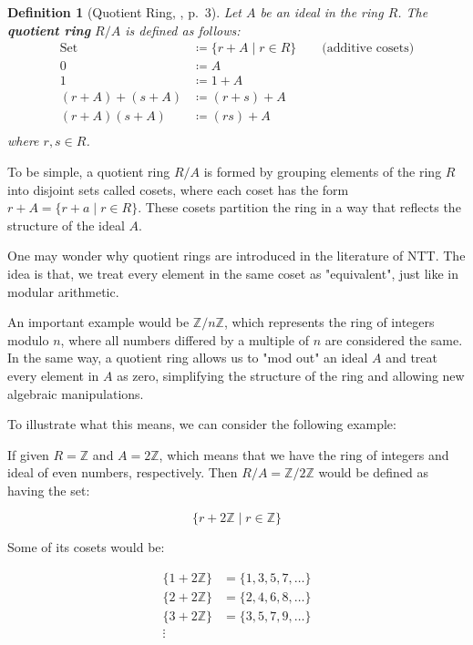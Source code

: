\documentclass[12pt]{article}
\newtheorem{definition}{Definition}[section]
\begin{document}
\begin{definition}[Quotient Ring, \cite{ideal_quotientring}, p.~3]
    Let $A$ be an ideal in the ring $R$.
    The \textbf{quotient ring} $R/A$ is defined as follows:
    \begin{align*}
        \text{Set} &\coloneq \{r + A \mid r \in R\} \qquad \text{(additive cosets)} \\
        0 &\coloneq A \\
        1 &\coloneq 1 + A \\
        (r + A) + (s + A) &\coloneq (r + s) + A \\
        (r + A)(s + A) &\coloneq (rs) + A \\
    \end{align*}
    where $r, s \in R$.
\end{definition}

To be simple, 
a quotient ring $R/A$ is formed by grouping elements of the ring $R$ into disjoint sets called cosets, 
where each coset has the form $r + A = \{r + a \mid r \in R\}$. 
These cosets partition the ring in a way that reflects the structure of the ideal $A$.

One may wonder why quotient rings are introduced in the literature of NTT.
The idea is that, we treat every element in the same coset as "equivalent", just like in modular arithmetic. 

An important example would be $\mathbb{Z}/n\mathbb{Z}$, which represents the ring of integers modulo $n$, 
where all numbers differed by a multiple of $n$ are considered the same. 
In the same way, a quotient ring allows us to "mod out" an ideal $A$ and treat every element in $A$ as zero, simplifying the structure of the ring and allowing new algebraic manipulations.

To illustrate what this means, 
we can consider the following example:

If given $R = \mathbb{Z}$ and $A = 2\mathbb{Z}$, 
which means that we have the ring of integers and ideal of even numbers, respectively.
Then $R/A = \mathbb{Z}/2\mathbb{Z}$ would be defined as having the set:

\begin{equation*}
    \{r + 2\mathbb{Z} \mid r \in \mathbb{Z}\}
\end{equation*}

Some of its cosets would be:

\begin{align*}
    \{1 + 2\mathbb{Z}\} &= \{1, 3, 5, 7, \ldots\} \\
    \{2 + 2\mathbb{Z}\} &= \{2, 4, 6, 8, \ldots\} \\
    \{3 + 2\mathbb{Z}\} &= \{3, 5, 7, 9, \ldots\} \\
    \vdots
\end{align*}
\end{document}
